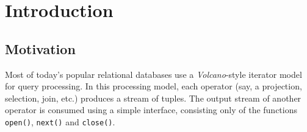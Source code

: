 \chapter{Introduction}

\section{Motivation}

Most of today's popular relational databases use a \emph{Volcano}-style iterator model \cite{Graefe:1994:VEP:627290.627558} for query processing. In this processing model, each operator (say, a projection, selection, join, etc.) produces a stream of tuples. The output stream of another operator is consumed using a simple interface, consisting only of the functions \texttt{open()}, \texttt{next()} and \texttt{close()}.

